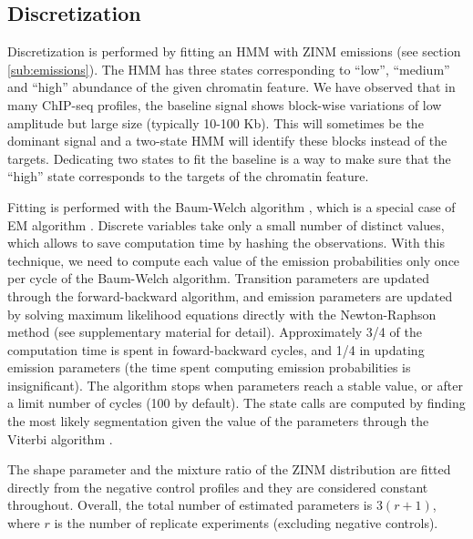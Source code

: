 \documentclass{bioinfo}
\begin{document}
\begin{methods}
\subsection{Discretization}
Discretization is performed by fitting an HMM
with ZINM emissions (see section \ref{sub:emissions}). The HMM has three
states corresponding to ``low'', ``medium'' and ``high'' abundance of
the given chromatin feature. We have observed that in many ChIP-seq
profiles, the baseline signal shows block-wise variations of low amplitude
but large size (typically 10-100 Kb). This will sometimes be the dominant
signal and a two-state HMM will identify these blocks instead of the
targets. Dedicating two states to fit the baseline is a way to make sure
that the ``high'' state corresponds to the targets of the chromatin
feature.

Fitting is performed with the Baum-Welch algorithm \citep{baum1966},
which is a special case of EM algorithm \citep{Dempster77maximumlikelihood}.
Discrete variables take only a small number of distinct values, which
allows to save computation time by hashing the observations. With this
technique, we need to compute each value of the emission probabilities
only once per cycle of the Baum-Welch algorithm. Transition parameters
are updated through the forward-backward algorithm, and emission
parameters are updated by solving maximum likelihood equations directly
with the Newton-Raphson method (see supplementary material for detail).
Approximately 3/4 of the computation time is spent in foward-backward
cycles, and 1/4 in updating emission parameters (the time spent computing
emission probabilities is insignificant). The algorithm stops when
parameters reach a stable value, or after a limit number of cycles (100
by default). The state calls are computed by finding the most likely
segmentation given the value of the parameters through the Viterbi
algorithm \citep{1054010}.

The shape parameter and the mixture ratio of the ZINM distribution
are fitted directly from the negative control profiles and they are
considered constant throughout. Overall, the total number of estimated
parameters is $3(r+1)$, where $r$ is the number of replicate experiments
(excluding negative controls).


\end{methods}
\end{document}
